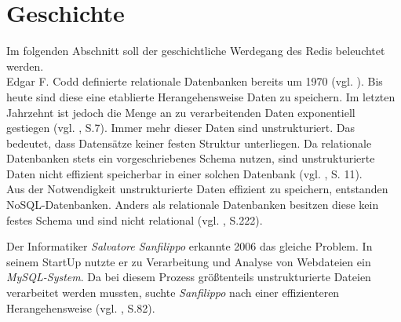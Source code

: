 
\section{Geschichte}
Im folgenden Abschnitt soll der geschichtliche Werdegang des \ac{Redis} beleuchtet werden.
\\Edgar F. Codd definierte relationale Datenbanken bereits um 1970 (vgl. \cite{codd}). Bis heute sind diese eine etablierte Herangehensweise Daten zu speichern. Im letzten Jahrzehnt ist jedoch die Menge an zu verarbeitenden Daten exponentiell gestiegen (vgl. \cite{nosql}, S.7). Immer mehr dieser Daten sind unstrukturiert. Das bedeutet, dass Datensätze keiner festen Struktur unterliegen. Da relationale Datenbanken stets ein vorgeschriebenes Schema nutzen, sind unstrukturierte Daten nicht effizient speicherbar in einer solchen Datenbank (vgl. \cite{2016sql}, S. 11). 
\\Aus der Notwendigkeit unstrukturierte Daten effizient zu speichern, entstanden \ac{NoSQL-Datenbanken}. Anders als relationale Datenbanken besitzen diese kein festes Schema und sind nicht relational (vgl. \cite{2016sql}, S.222).

Der Informatiker \textit{Salvatore Sanfilippo} erkannte 2006 das gleiche Problem. In seinem StartUp nutzte er zu Verarbeitung und Analyse von Webdateien ein\textit{ MySQL-System}. Da bei diesem Prozess größtenteils unstrukturierte Dateien verarbeitet werden mussten, suchte \textit{Sanfilippo} nach einer effizienteren Herangehensweise (vgl. \cite{nosql}, S.82).
     